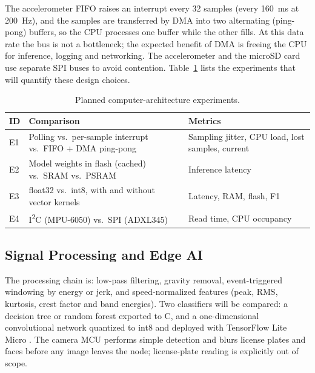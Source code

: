 \documentclass[journal,10pt]{IEEEtran}
\begin{document}
The accelerometer FIFO raises an interrupt every 32 samples (every 160~ms at 200~Hz), and the samples are transferred by DMA into two alternating (ping-pong) buffers, so the CPU processes one buffer while the other fills. At this data rate the bus is not a bottleneck; the expected benefit of DMA is freeing the CPU for inference, logging and networking. The accelerometer and the microSD card use separate SPI buses to avoid contention. Table~\ref{tab:exp} lists the experiments that will quantify these design choices.

\begin{table}[!t]
\centering
\caption{Planned computer-architecture experiments.}
\label{tab:exp}
\footnotesize
\begin{tabularx}{\columnwidth}{@{}l>{\raggedright\arraybackslash}X>{\raggedright\arraybackslash}X@{}}
\toprule
\textbf{ID} & \textbf{Comparison} & \textbf{Metrics} \\
\midrule
E1 & Polling vs.\ per-sample interrupt vs.\ FIFO + DMA ping-pong & Sampling jitter, CPU load, lost samples, current \\
E2 & Model weights in flash (cached) vs.\ SRAM vs.\ PSRAM & Inference latency \\
E3 & float32 vs.\ int8, with and without vector kernels & Latency, RAM, flash, F1 \\
E4 & I\textsuperscript{2}C (MPU-6050) vs.\ SPI (ADXL345) & Read time, CPU occupancy \\
\bottomrule
\end{tabularx}
\end{table}

\subsection{Signal Processing and Edge AI}
The processing chain is: low-pass filtering, gravity removal, event-triggered windowing by energy or jerk, and speed-normalized features (peak, RMS, kurtosis, crest factor and band energies). Two classifiers will be compared: a decision tree or random forest exported to C, and a one-dimensional convolutional network quantized to int8 \cite{jacob2018quant} and deployed with TensorFlow Lite Micro \cite{david2021tflm}. The camera MCU performs simple detection and blurs license plates and faces before any image leaves the node; license-plate reading is explicitly out of scope.
\end{document}
